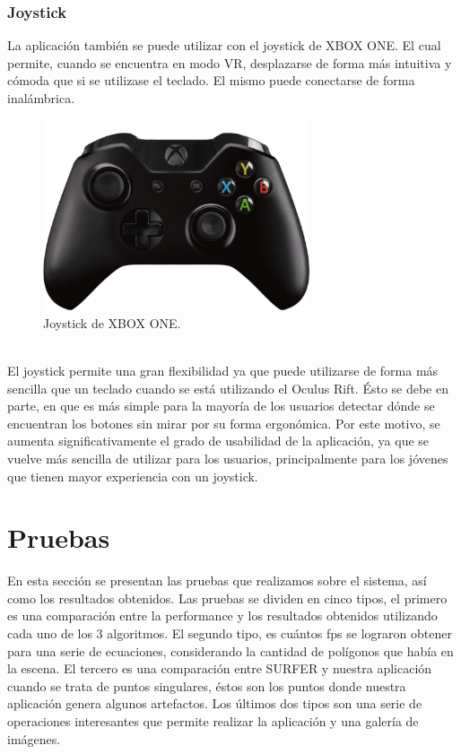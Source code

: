 \documentclass[12pt]{article}
\begin{document}
\subsubsection{Joystick}
La aplicación también se puede utilizar con el joystick de XBOX ONE. El cual permite, cuando se encuentra en modo VR, desplazarse de forma más intuitiva y cómoda que si se utilizase el teclado. El mismo puede conectarse de forma inalámbrica.\\
\begin{figure}[h!]
\includegraphics[width=0.7\textwidth,center]{joystickPosta.png}
\caption{Joystick de XBOX ONE.}
\end{figure}
\\El joystick permite una gran flexibilidad ya que puede utilizarse de forma más sencilla que un teclado cuando se está utilizando el Oculus Rift. Ésto se debe en parte, en que es más simple para la mayoría de los usuarios detectar dónde se encuentran los botones sin mirar por su forma ergonómica. Por este motivo, se aumenta significativamente el grado de usabilidad de la aplicación, ya que se vuelve más sencilla de utilizar para los usuarios, principalmente para los jóvenes que tienen mayor experiencia con un joystick.
\clearpage
\section{Pruebas}
En esta sección se presentan las pruebas que realizamos sobre el sistema, así como los resultados obtenidos. Las pruebas se dividen en cinco tipos, el primero es una comparación entre la performance y los resultados obtenidos utilizando cada uno de los 3 algoritmos. El segundo tipo, es cuántos fps se lograron obtener para una serie de ecuaciones, considerando la cantidad de polígonos que había en la escena. El tercero es una comparación entre SURFER y nuestra aplicación cuando se trata de puntos singulares, éstos son los puntos donde nuestra aplicación genera algunos artefactos. Los últimos dos tipos son una serie de operaciones interesantes que permite realizar la aplicación y una galería de imágenes.
\end{document}
